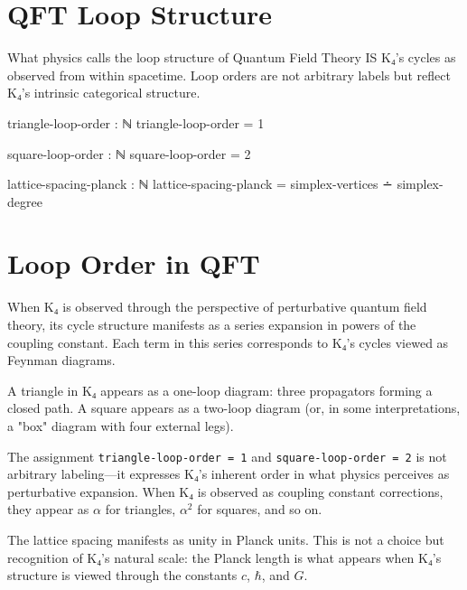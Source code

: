 \documentclass[11pt,a4paper]{book}
\begin{document}
\section{QFT Loop Structure}

What physics calls the loop structure of Quantum Field Theory IS K₄'s cycles as observed 
from within spacetime. Loop orders are not arbitrary labels but reflect K₄'s intrinsic 
categorical structure.

\begin{code}
triangle-loop-order : ℕ
triangle-loop-order = 1

square-loop-order : ℕ
square-loop-order = 2

lattice-spacing-planck : ℕ
lattice-spacing-planck = simplex-vertices ∸ simplex-degree
\end{code}

\section{Loop Order in QFT}

When K₄ is observed through the perspective of perturbative quantum field theory, its 
cycle structure manifests as a series expansion in powers of the coupling constant. Each 
term in this series corresponds to K₄'s cycles viewed as Feynman diagrams.

A triangle in K₄ appears as a one-loop diagram: three propagators forming a closed 
path. A square appears as a two-loop diagram (or, in some interpretations, a "box" 
diagram with four external legs).

The assignment \texttt{triangle-loop-order = 1} and \texttt{square-loop-order = 2} is 
not arbitrary labeling—it expresses K₄'s inherent order in what physics perceives as 
perturbative expansion. When K₄ is observed as coupling constant corrections, they 
appear as $\alpha$ for triangles, $\alpha^2$ for squares, and so on.

The lattice spacing manifests as unity in Planck units. This is not a choice but 
recognition of K₄'s natural scale: the Planck length is what appears when K₄'s structure 
is viewed through the constants $c$, $\hbar$, and $G$.
\end{document}
